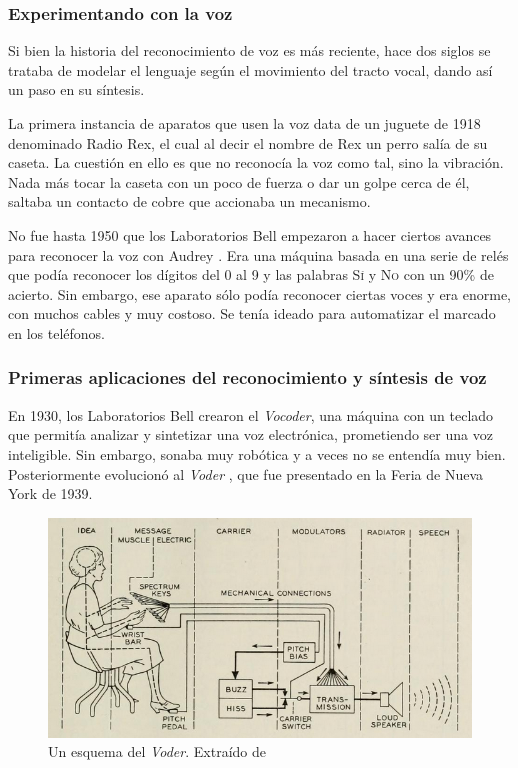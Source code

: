 \subsubsection{Experimentando con la voz}
Si bien la historia del reconocimiento de voz es más reciente, hace dos siglos se trataba de modelar el lenguaje según el movimiento del tracto vocal, dando así un paso en su síntesis.

La primera instancia de aparatos que usen la voz data de un juguete de 1918 denominado Radio Rex, el cual al decir el nombre de Rex un perro salía de su caseta. La cuestión en ello es que no reconocía la voz como tal, sino la vibración. Nada más tocar la caseta con un poco de fuerza o dar un golpe cerca de él, saltaba un contacto de cobre que accionaba un mecanismo.

No fue hasta 1950 que los Laboratorios Bell empezaron a hacer ciertos avances para reconocer la voz con Audrey \cite{audrey}. Era una máquina basada en una serie de relés que podía reconocer los dígitos del 0 al 9 y las palabras \textsc{Sí} y \textsc{No} con un 90\% de acierto. Sin embargo, ese aparato sólo podía reconocer ciertas voces y era enorme, con muchos cables y muy costoso. Se tenía ideado para automatizar el marcado en los teléfonos.

\subsubsection{Primeras aplicaciones del reconocimiento y síntesis de voz}
En 1930, los Laboratorios Bell crearon el \textit{Vocoder}, una máquina con un teclado que permitía analizar y sintetizar una voz electrónica, prometiendo ser una voz inteligible. Sin embargo, sonaba muy robótica y a veces no se entendía muy bien. Posteriormente evolucionó al \textit{Voder} \cite{voder}, que fue presentado en la Feria de Nueva York de 1939.

\begin{figure}[H]
	\centering
	\includegraphics[width=\textwidth]{imagenes/Voder.png}
	\caption{Un esquema del \textit{Voder}. Extraído de \cite{voder}}
\end{figure}

